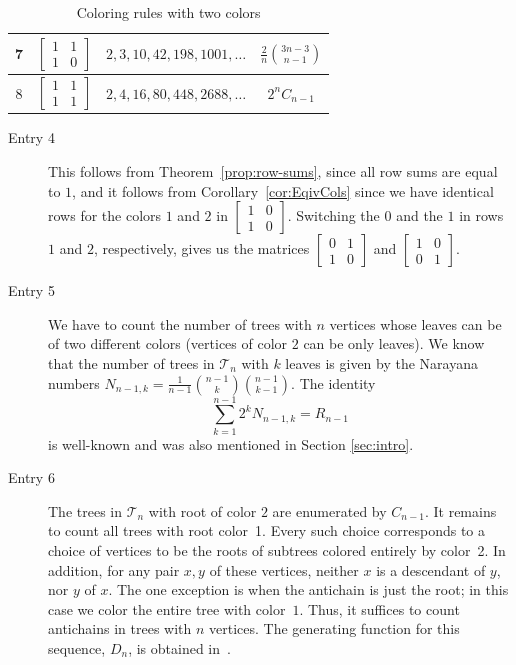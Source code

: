 \documentclass[12pt]{amsart}
\begin{document}
\begin{table}[htbp]
\begin{tabular}{ | c | c | c | c | }
\hline
7 & $\begin{bmatrix}
1 & 1 \\
1 & 0 
\end{bmatrix}$ & $2, 3, 10,42,198,1001, \ldots$ & $
\frac{2}{n}\binom{3n-3}{n-1}$\\
\hline
8 & $\begin{bmatrix}
1 & 1 \\
1 & 1 
\end{bmatrix}$ & $2, 4, 16, 80, 448, 2688, \ldots$ & $
2^n C_{n-1}$\\
\hline
\end{tabular}
\caption{Coloring rules with two colors}
\label{tb:2cols}
\end{table}
\begin{description}
    \item[Entry 4] This follows from Theorem~\ref{prop:row-sums}, since all row sums are equal to $1$, and it follows from Corollary~\ref{cor:EqivCols} since we have identical rows for the colors $1$ and $2$ in $\begin{bmatrix}
1 & 0 \\
1 & 0 
\end{bmatrix}$. Switching the $0$ and the $1$ in rows $1$ and $2$, respectively, gives us the matrices $\begin{bmatrix}
0 & 1 \\
1 & 0 
\end{bmatrix}$ and $\begin{bmatrix}
1 & 0 \\
0 & 1 
\end{bmatrix}$.\\
\vspace{1mm}
    \item[Entry 5] 
    We have to count the number of trees with $n$ vertices whose leaves can be of two different colors (vertices of color $2$ can be only leaves). We know that the number of trees in $\mathcal{T}_{n}$ with $k$ leaves is given by the Narayana numbers $N_{n-1,k} = \frac{1}{n-1}\binom{n-1}{k}\binom{n-1}{k-1}$. The identity 
    $$
    \sum\limits_{k=1}^{n-1}2^{k}N_{n-1,k} = R_{n-1}
    $$
    is well-known and was also mentioned in Section \ref{sec:intro}.\\
\vspace{1mm}
\item[Entry 6] The trees in $\mathcal{T}_{n}$ with root of color $2$ are enumerated by $C_{n-1}$. It remains to count all trees with root color~1. Every such choice corresponds to a choice of vertices to be the roots of subtrees colored entirely by color~2. In addition, for any pair $x,y$ of these vertices, neither $x$ is a descendant of $y$, nor $y$ of $x$. The one exception is when the antichain is just the root; in this case we color the entire tree with color~$1$. Thus, it suffices to count antichains in trees with $n$ vertices. The generating function for this sequence, $D_{n}$, is obtained in~\cite{Klazar1997Twelve,Klazar1997Addendum}.\\

\end{description}
\end{document}
